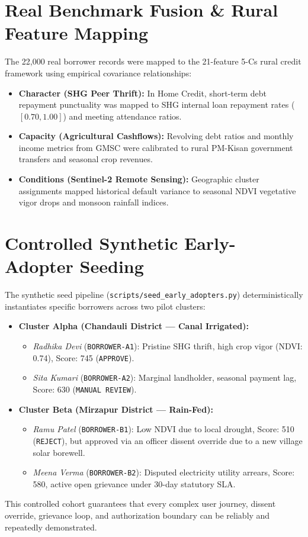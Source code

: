 \documentclass[11pt,a4paper,oneside]{report}
\begin{document}
\section{Real Benchmark Fusion \& Rural Feature Mapping}
The 22,000 real borrower records were mapped to the 21-feature 5-Cs rural credit framework using empirical covariance relationships:
\begin{itemize}
  \item \textbf{Character (SHG Peer Thrift):} In Home Credit, short-term debt repayment punctuality was mapped to SHG internal loan repayment rates ($[0.70, 1.00]$) and meeting attendance ratios.
  \item \textbf{Capacity (Agricultural Cashflows):} Revolving debt ratios and monthly income metrics from GMSC were calibrated to rural PM-Kisan government transfers and seasonal crop revenues.
  \item \textbf{Conditions (Sentinel-2 Remote Sensing):} Geographic cluster assignments mapped historical default variance to seasonal NDVI vegetative vigor drops and monsoon rainfall indices.
\end{itemize}

\section{Controlled Synthetic Early-Adopter Seeding}
The synthetic seed pipeline (\texttt{scripts/seed\_early\_adopters.py}) deterministically instantiates specific borrowers across two pilot clusters:
\begin{itemize}
  \item \textbf{Cluster Alpha (Chandauli District --- Canal Irrigated):}
    \begin{itemize}
      \item \textit{Radhika Devi} (\texttt{BORROWER-A1}): Pristine SHG thrift, high crop vigor (NDVI: 0.74), Score: 745 (\texttt{APPROVE}).
      \item \textit{Sita Kumari} (\texttt{BORROWER-A2}): Marginal landholder, seasonal payment lag, Score: 630 (\texttt{MANUAL REVIEW}).
    \end{itemize}
  \item \textbf{Cluster Beta (Mirzapur District --- Rain-Fed):}
    \begin{itemize}
      \item \textit{Ramu Patel} (\texttt{BORROWER-B1}): Low NDVI due to local drought, Score: 510 (\texttt{REJECT}), but approved via an officer dissent override due to a new village solar borewell.
      \item \textit{Meena Verma} (\texttt{BORROWER-B2}): Disputed electricity utility arrears, Score: 580, active open grievance under 30-day statutory SLA.
    \end{itemize}
\end{itemize}
This controlled cohort guarantees that every complex user journey, dissent override, grievance loop, and authorization boundary can be reliably and repeatedly demonstrated.
\end{document}
